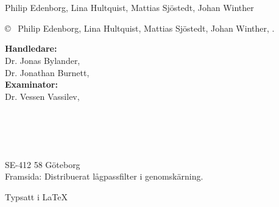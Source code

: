 \documentclass[../../main.tex]{subfiles}
\begin{document}
\newpage
\thispagestyle{plain}
\vspace*{4.5cm}
\titel\\
\undertitel\\
\newline
Philip Edenborg, Lina Hultquist, Mattias Sjöstedt, Johan Winther \setlength{\parskip}{1cm}

\copyright ~ Philip Edenborg, Lina Hultquist, Mattias Sjöstedt, Johan Winther, \the\year. \setlength{\parskip}{1cm}

\textbf{Handledare:}\\
Dr. Jonas Bylander, \department\\
Dr. Jonathan Burnett, \department\\
\textbf{Examinator:}\\
Dr. Vessen Vassilev, \department\setlength{\parskip}{1cm}

\reportnr\\	%
\department\\
\division\\
\university\\
SE-412 58 Göteborg\\

\vfill
Framsida: Distribuerat lågpassfilter i genomskärning.
\setlength{\parskip}{0.5cm}

Typsatt i \LaTeX \\
\adress
\end{document}

